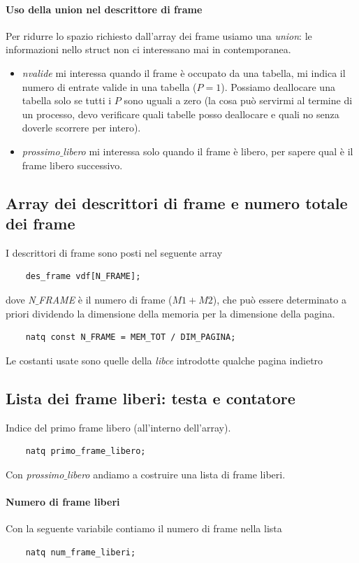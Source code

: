 \paragraph{Uso della union nel descrittore di frame}
Per ridurre lo spazio richiesto dall'array dei frame usiamo una \emph{union}: le informazioni nello struct non ci interessano mai in contemporanea.
\begin{itemize}
	\item \emph{nvalide} mi interessa quando il frame è occupato da una tabella, mi indica il numero di entrate valide in una tabella ($P=1$). Possiamo deallocare una tabella solo se tutti i $P$ sono uguali a zero (la cosa può servirmi al termine di un processo, devo verificare quali tabelle posso deallocare e quali no senza doverle scorrere per intero).
	\item \emph{prossimo$\_$libero} mi interessa solo quando il frame è libero, per sapere qual è il frame libero successivo.
\end{itemize}
\subsection{Array dei descrittori di frame e numero totale dei frame}
I descrittori di frame sono posti nel seguente array
\begin{verbatim}
	des_frame vdf[N_FRAME];
\end{verbatim}
dove \emph{N$\_$FRAME} è il numero di frame ($M1+M2$), che può essere determinato a priori dividendo la dimensione della memoria per la dimensione della pagina.
\begin{verbatim}
	natq const N_FRAME = MEM_TOT / DIM_PAGINA;
\end{verbatim}
Le costanti usate sono quelle della \emph{libce} introdotte qualche pagina indietro
\subsection{Lista dei frame liberi: testa e contatore}
Indice del primo frame libero (all'interno dell'array). 
\begin{verbatim}
	natq primo_frame_libero;
\end{verbatim}Con \emph{prossimo$\_$libero} andiamo a costruire una lista di frame liberi.
\paragraph{Numero di frame liberi}
Con la seguente variabile contiamo il numero di frame nella lista
\begin{verbatim}
	natq num_frame_liberi;
\end{verbatim}

